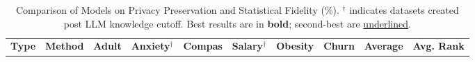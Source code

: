 \begin{table}[ht]
\small
\centering

\setlength{\tabcolsep}{1mm} 
\caption{Comparison of Models on Privacy Preservation and Statistical Fidelity (\%). $^\dag$ indicates datasets created post LLM knowledge cutoff. Best results are in \textbf{bold}; second-best are \underline{underlined}.}

\begin{tabular}{ll|llllll|c|c}
\toprule

\textbf{Type} & \textbf{Method} & 
\multicolumn{1}{c}{\textbf{Adult}} &
\multicolumn{1}{c}{\textbf{Anxiety$^\dag$}} &
\multicolumn{1}{c}{\textbf{Compas}} &
\multicolumn{1}{c}{\textbf{Salary$^\dag$}} &
\multicolumn{1}{c}{\textbf{Obesity}} &
\multicolumn{1}{c}{\textbf{Churn}} &
\textbf{Average} & \textbf{Avg. Rank} \\


\end{tabular}
\end{table}
